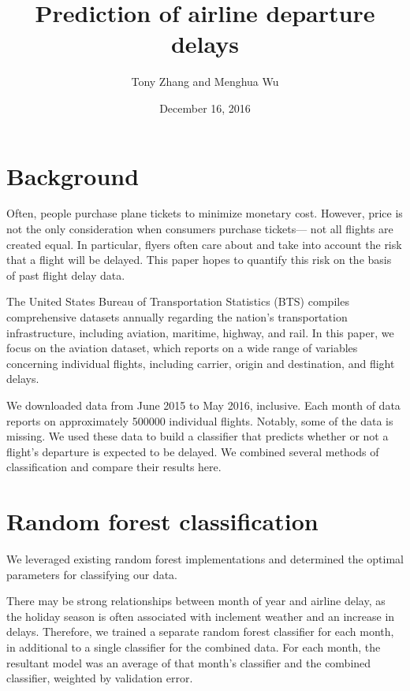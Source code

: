 \documentclass{article}
\title{Prediction of airline departure delays}
\author{Tony Zhang and Menghua Wu}
\date{December 16, 2016}
\begin{document}
\maketitle

\begin{multicols}{2}


\section{Background}
\label{sec:bg}

Often, people purchase plane tickets
to minimize monetary cost.
However, price is not the only consideration
when consumers purchase tickets---
not all flights are created equal.
In particular,
flyers often care about and take into account
the risk that a flight will be delayed.
This paper hopes to quantify this risk
on the basis of past flight delay data.

The United States Bureau of Transportation Statistics (BTS)
compiles comprehensive datasets annually
regarding the nation's transportation infrastructure,
including aviation, maritime, highway, and rail.
In this paper, we focus on the aviation dataset,
which reports on a wide range of variables concerning individual flights,
including carrier, origin and destination, and flight delays.

We downloaded data from June 2015 to May 2016, inclusive.
Each month of data reports on
approximately 500000 individual flights.
Notably, some of the data is missing.
We used these data to build a classifier
that predicts whether or not a flight's departure
is expected to be delayed.
We combined several methods of classification
and compare their results here.

\section{Random forest classification}

We leveraged existing random forest implementations
and determined the optimal parameters for classifying our data.

There may be strong relationships between
month of year and airline delay,
as the holiday season is often associated with
inclement weather and an increase in delays.
Therefore, we trained a separate random forest classifier
for each month, in additional to a single classifier
for the combined data.
For each month,
the resultant model was an average of
that month's classifier and the combined classifier,
weighted by validation error.


\end{multicols}
\end{document}
